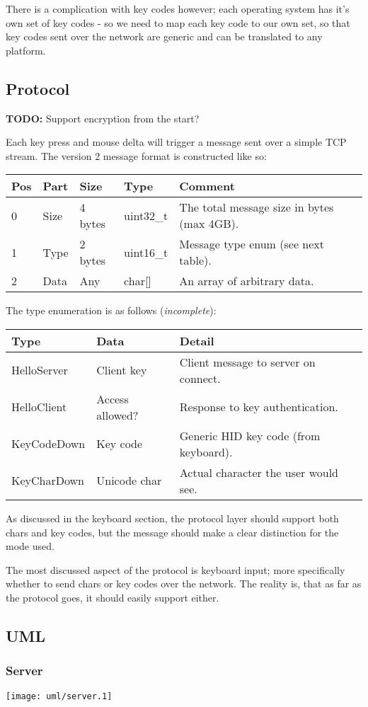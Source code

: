 There is a complication with key codes however; each operating system has it's
own set of key codes - so we need to map each key code to our own set, so that
key codes sent over the network are generic and can be translated to any 
platform.

\subsection{Protocol}

\textbf{TODO:} Support encryption from the start?

Each key press and mouse delta will trigger a message sent over a simple TCP 
stream. The version 2 message format is constructed like so:

\begin{tabular}{|l|l|l|l|l|}
\hline
\textbf{Pos} &
\textbf{Part} &
\textbf{Size} &
\textbf{Type} &
\textbf{Comment} \\
\hline
0 & Size & 4 bytes & uint32\_t & The total message size in bytes (max 4GB). \\
1 & Type & 2 bytes & uint16\_t & Message type enum (see next table). \\
2 & Data & Any & char[] & An array of arbitrary data. \\
\hline
\end{tabular}

The type enumeration is as follows (\textit{incomplete}):

\begin{tabular}{|l|l|l|}
\hline
\textbf{Type} &
\textbf{Data} &
\textbf{Detail} \\
\hline
HelloServer & Client key & Client message to server on connect. \\
HelloClient & Access allowed? & Response to key authentication. \\
KeyCodeDown & Key code & Generic HID key code (from keyboard). \\
KeyCharDown & Unicode char & Actual character the user would see. \\
\hline
\end{tabular}

As discussed in the keyboard section, the protocol layer should support both
chars and key codes, but the message should make a clear distinction for the
mode used.

The most discussed aspect of the protocol is keyboard input; more specifically
whether to send chars or key codes over the network. The reality is, that as far
as the protocol goes, it should easily support either.

\subsection{UML}

\subsubsection{Server}

\texttt{[image: uml/server.1]}
